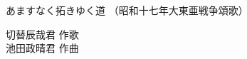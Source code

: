 \documentclass[10pt,b5j]{tarticle} %
\begin{document}
\begin{minipage}[c]{0.7\hsize} %
    \begin{center}
        {\LARGE
            あますなく拓きゆく道 %
        }
        {\small 
            （昭和十七年大東亜戦争頌歌） %
        }
    \end{center}
\end{minipage}
\begin{minipage}[c]{0.3\hsize} %
    \begin{flushright} %
        切替辰哉君 作歌\\池田政晴君 作曲 %
    \end{flushright}
\end{minipage}
\end{document}
